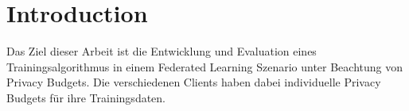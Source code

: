 \chapter{Introduction}

Das Ziel dieser Arbeit ist die Entwicklung und Evaluation eines Trainingsalgorithmus in einem Federated Learning Szenario unter Beachtung von Privacy Budgets. Die verschiedenen Clients haben dabei individuelle Privacy Budgets für ihre Trainingsdaten.
